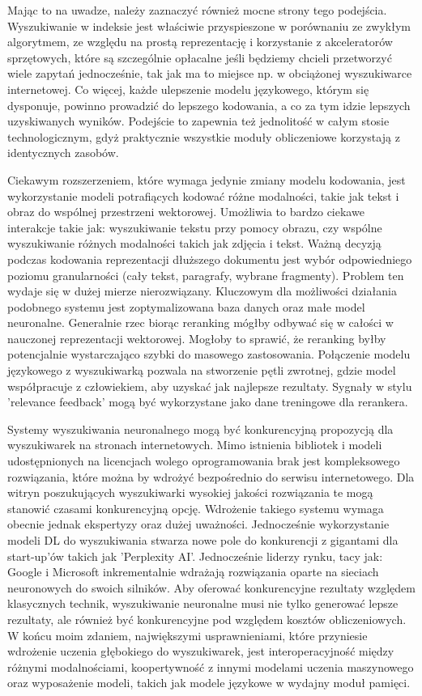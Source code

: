 Mając to na uwadze, należy zaznaczyć również mocne strony tego podejścia. Wyszukiwanie w indeksie jest właściwie przyspieszone w porównaniu ze zwykłym algorytmem, ze względu na prostą reprezentację i korzystanie z akceleratorów sprzętowych, które są szczególnie opłacalne jeśli będziemy chcieli przetworzyć wiele zapytań jednocześnie, tak jak ma to miejsce np. w obciążonej wyszukiwarce internetowej. Co więcej, każde ulepszenie modelu językowego, którym się dysponuje, powinno prowadzić do lepszego kodowania, a co za tym idzie lepszych uzyskiwanych wyników. Podejście to zapewnia też jednolitość w całym stosie technologicznym, gdyż praktycznie wszystkie moduły obliczeniowe korzystają z identycznych zasobów. \newline

Ciekawym rozszerzeniem, które wymaga jedynie zmiany modelu kodowania, jest wykorzystanie modeli potrafiących kodować różne modalności, takie jak tekst i obraz do wspólnej przestrzeni wektorowej. Umożliwia to bardzo ciekawe interakcje takie jak: wyszukiwanie tekstu przy pomocy obrazu, czy wspólne wyszukiwanie różnych modalności takich jak zdjęcia i tekst. Ważną decyzją podczas kodowania reprezentacji dłuższego dokumentu jest wybór odpowiedniego poziomu granularności (cały tekst, paragrafy, wybrane fragmenty). Problem ten wydaje się w dużej mierze nierozwiązany. Kluczowym dla możliwości działania podobnego systemu jest zoptymalizowana baza danych oraz małe model neuronalne. Generalnie rzec biorąc reranking mógłby odbywać się w całości w nauczonej reprezentacji wektorowej. Mogłoby to sprawić, że reranking byłby potencjalnie wystarczająco szybki do masowego zastosowania. Połączenie modelu językowego z wyszukiwarką pozwala na stworzenie pętli zwrotnej, gdzie model współpracuje z człowiekiem, aby uzyskać jak najlepsze rezultaty. Sygnały w stylu 'relevance feedback' mogą być wykorzystane jako dane treningowe dla rerankera.\newline

Systemy wyszukiwania neuronalnego mogą być konkurencyjną propozycją dla wyszukiwarek na stronach internetowych. Mimo istnienia bibliotek i modeli udostępnionych na licencjach wolego oprogramowania brak jest kompleksowego rozwiązania, które można by wdrożyć bezpośrednio do serwisu internetowego. Dla witryn poszukujących wyszukiwarki wysokiej jakości rozwiązania te mogą stanowić czasami konkurencyjną opcję. Wdrożenie takiego systemu wymaga obecnie jednak ekspertyzy oraz dużej uważności. Jednocześnie wykorzystanie modeli DL do wyszukiwania stwarza nowe pole do konkurencji z gigantami dla start-up'ów takich jak 'Perplexity AI'. Jednocześnie liderzy rynku, tacy jak: Google i Microsoft inkrementalnie wdrażają rozwiązania oparte na sieciach neuronowych do swoich silników. Aby oferować konkurencyjne rezultaty względem klasycznych technik, wyszukiwanie neuronalne musi nie tylko generować lepsze rezultaty, ale również być konkurencyjne pod względem kosztów obliczeniowych. W końcu moim zdaniem, największymi usprawnieniami, które przyniesie wdrożenie uczenia głębokiego do wyszukiwarek, jest interoperacyjność między różnymi modalnościami, koopertywność z innymi modelami uczenia maszynowego oraz wyposażenie modeli, takich jak modele językowe w wydajny moduł pamięci.\newline
